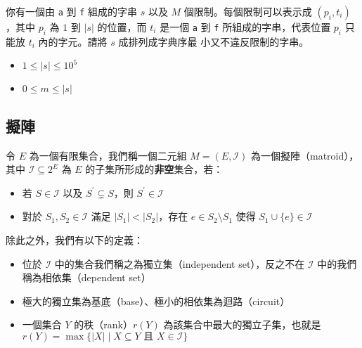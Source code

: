 \documentclass[standalone]{beamer}
\begin{document}
\begin{frame}{}
  \begin{problem}
    你有一個由 \texttt{a} 到 \texttt{f} 組成的字串 $s$ 以及 $M$ 個限制。每個限制可以表示成
    $(p_i, t_i)$，其中 $p_i$ 為 $1$ 到 $|s|$ 的位置，而 $t_i$ 是一個 \texttt{a} 到
    \texttt{f} 所組成的字串，代表位置 $p_i$ 只能放 $t_i$ 內的字元。請將 $s$ 成排列成字典序最
    小又不違反限制的字串。

    \begin{itemize}
      \item $1 \leq |s| \leq 10^5$
      \item $0 \leq m \leq |s|$
    \end{itemize}
  \end{problem}
\end{frame}

\subsection{擬陣}

\begin{frame}{}
  \begin{definition}
    令 $E$ 為一個有限集合，我們稱一個二元組 $M = (E, \mathcal{I})$ 為一個擬陣（matroid），
    其中 $\mathcal{I} \subseteq 2^E$ 為 $E$ 的子集所形成的\textbf{非空}集合，若：

    \begin{itemize}
      \item 若 $S \in \mathcal{I}$ 以及 $S^\prime \subsetneq S$，則
        $S^\prime \in \mathcal{I}$
      \item 對於 $S_1, S_2 \in \mathcal{I}$ 滿足 $|S_1| < |S_2|$，存在
        $e \in S_2 \setminus S_1$ 使得 $S_1 \cup \{e\} \in \mathcal{I}$
    \end{itemize}

     {
      除此之外，我們有以下的定義：

      \begin{itemize}
        \item 位於 $\mathcal{I}$ 中的集合我們稱之為獨立集（independent set），反之不在
          $\mathcal{I}$ 中的我們稱為相依集（dependent set）
        \item 極大的獨立集為基底（base）、極小的相依集為迴路（circuit）
        \item 一個集合 $Y$ 的秩（rank）$r(Y)$ 為該集合中最大的獨立子集，也就是
          $r(Y) = \max\{|X| \mid X \subseteq Y \text{ 且 } X \in \mathcal{I} \}$
      \end{itemize}
    }
  \end{definition}
\end{frame}
\end{document}
